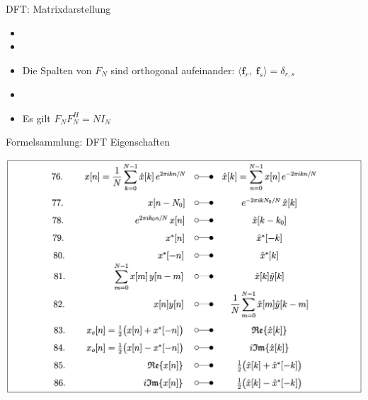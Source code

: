 \documentclass[14pt, aspectratio=169, handout]{beamer}
\begin{document}
\begin{frame}{DFT: Matrixdarstellung}
    

\begin{itemize}
    \item[] 
    \item[] 
    \item[] Die Spalten von $F_N$ sind orthogonal aufeinander: $\langle \mathbf{f}_r, \; \mathbf{f}_s \rangle = \delta_{r,s}$
    \item[] 
    \item[] Es gilt $F_N F_N^H = N I_N$
\end{itemize}
\end{frame}

\begin{frame}{Formelsammlung: DFT Eigenschaften}
    \begin{center}
        \includegraphics[width=0.75\linewidth]{figures/DFT_Eigenschaften.png}
    \end{center}
\end{frame}
\end{document}
